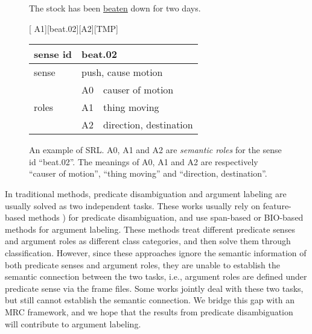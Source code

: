 \documentclass[11pt]{article}
\begin{document}
\begin{figure}
\centering
{\linespread{0.5}\selectfont
The stock has been \underline{beaten} down for two days.\par
{\small \begin{flushleft} \hspace{1em} [\hspace{1.1em} A1\hspace{1.1em}]\hspace{5.0em}[beat.02]\hspace{0.1em}[\hspace{0.3em}A2\hspace{0.3em}]\hspace{0.3em}[\hspace{1.7em}TMP\hspace{1.7em}] \end{flushleft}}}

\vspace{4pt}
\begin{tabular}{|l|l|l|} 
\hline
sense id            & \multicolumn{2}{l|}{beat.02}             \\ 
\hline
sense                  & \multicolumn{2}{l|}{push, cause motion}  \\ 
\hline
 & A0 & causer of motion                  \\ 
\cline{2-3}
roles                       & A1 & thing moving                      \\ 
\cline{2-3}
                       & A2 & direction, destination            \\
\hline
\end{tabular}
\caption{An example of SRL. A0, A1 and A2 are {\it semantic roles} for the sense id ``beat.02''. The meanings of A0, A1 and A2 are respectively ``causer of motion'', ``thing moving'' and ``direction, destination''.}
\label{fig:example}
\end{figure}
\par



In traditional methods, predicate disambiguation and argument labeling are usually solved as two independent tasks. 
These works usually rely on feature-based methods \cite{he-etal-2018-syntax,roth-lapata-2016-neural,che2010using}) for predicate disambiguation, and use span-based  \cite{ouchi-etal-2018-span,he2018jointly,li2019dependency} or BIO-based \cite{he2017deep,strubell-etal-2018-linguistically,shi2019simple}  methods for argument labeling. These methods treat different predicate senses and argument roles as different class categories, and then solve them through classification. However, since these approaches ignore the semantic information of both predicate senses and argument roles, they are unable to establish the semantic connection between the two tasks, i.e., argument roles are defined under predicate sense via the frame files. Some works \cite{cai2018full,Conia2020BridgingTG} jointly deal with these two tasks, but still cannot establish the semantic connection. We bridge this gap with an MRC framework, and we hope that the results from predicate disambiguation will contribute to argument labeling.
\end{document}
